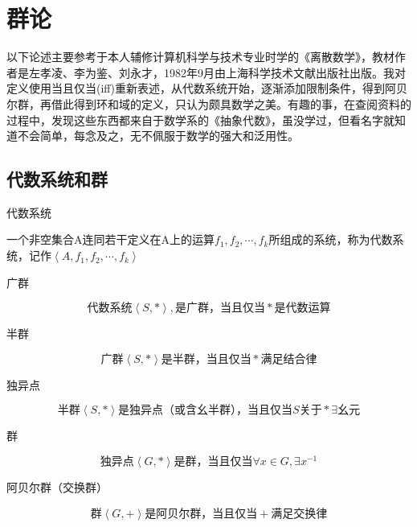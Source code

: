 \documentclass[12pt,hyperref,a4paper,UTF8]{ctexart}
\begin{document}
\section{群论}

以下论述主要参考于本人辅修计算机科学与技术专业时学的《离散数学》，教材作者是左孝凌、李为鉴、刘永才，1982年9月由上海科学技术文献出版社出版。我对定义使用当且仅当(iff)重新表述，从代数系统开始，逐渐添加限制条件，得到阿贝尔群，再借此得到环和域的定义，只认为颇具数学之美。有趣的事，在查阅资料的过程中，发现这些东西都来自于数学系的《抽象代数》，虽没学过，但看名字就知道不会简单，每念及之，无不佩服于数学的强大和泛用性。

\subsection{代数系统和群}

代数系统
\begin{Definition}

    一个非空集合A连同若干定义在A上的运算$f_1,f_2,\cdots ,f_k$所组成的系统，称为代数系统，记作$\left< A,f_1,f_2,\cdots ,f_k \right>  $
\end{Definition}



广群
\begin{Definition}
$$
\text{代数系统}\left< S,* \right> ,\text{是广群，当且仅当}* \text{是代数运算}
$$
\end{Definition}

半群
\begin{Definition}
$$
\text{广群}\left< S,* \right> \text{是半群，当且仅当}*\text{满足结合律}
$$
\end{Definition}

独异点
\begin{Definition}
$$
\text{半群}\left< S,* \right> \text{是独异点（或含幺半群），当且仅当}S\text{关于}* \exists \text{幺元}
$$
\end{Definition}

群
\begin{Definition}
$$
\text{独异点}\left< G,* \right> \text{是群，当且仅当}\forall{x}\in G ,\exists x^{-1}
$$
\end{Definition}

阿贝尔群（交换群）
\begin{Definition}\label{base4}
$$
\text{群}\left< G,+ \right> \text{是阿贝尔群，当且仅当}+\text{满足交换律}
$$
\end{Definition}
\end{document}
